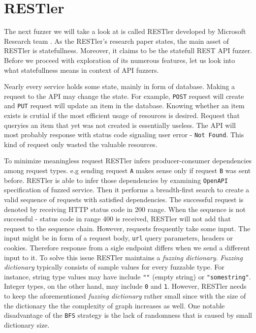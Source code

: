 \section{RESTler}
The next fuzzer we will take a look at is called RESTler developed by Microsoft Research team \cite{atlidakis2019restler}. As the RESTler's research paper states, the main asset of RESTler is statefullness. Moreover, it claims to be the statefull REST API fuzzer. Before we proceed with exploration of its numerous features, let us look into what statefullness means in context of API fuzzers.

Nearly every service holds some state, mainly in form of database. Making a request to the API may change the state. For example, \texttt{POST} request will create and \texttt{PUT} request will update an item in the database. Knowing whether an item exists is crutial if the most  efficient usage of resources is desired. Request that queryies an item that yet was not created is essentially useless. The API will most probably response with status code signaling user error - \texttt{Not Found}. This kind of request only wasted the valuable resources.

To minimize meaningless request RESTler infers producer-consumer dependencies among request types. e.g sending request \texttt{A} makes sense only if request \texttt{B} was sent before. RESTler is able to infer those dependencies by examining \texttt{OpenAPI} specification of fuzzed service. Then it performs a breadth-first search to create a valid sequence of requests with satisfied dependencies. The successful request is denoted by receiving HTTP status code in 200 range. When the sequence is not successful - status code in range 400 is received, RESTler will not add that request to the sequence chain. However, requests frequently take some input. The input might be in form of a request body, \texttt{url} query parameters, headers or cookies. Therefore response from a sigle endpoint differs when we send a different input to it. To solve this issue RESTler maintains a \textit{fuzzing dictionary}. \textit{Fuzzing dictionary} typically consists of sample values for every fuzzable type. For instance, string type values may have include \texttt{""} (empty string) or \texttt{"somestring"}. Integer types, on the other hand, may include \texttt{0} and \texttt{1}. However, RESTler needs to keep the aforementioned \textit{fuzzing dictionary} rather small since with the size of the dictionary the the complexity of graph increases as well. One notable disadvantage of the \texttt{BFS} strategy is the lack of randomness that is caused by small dictionary size.

